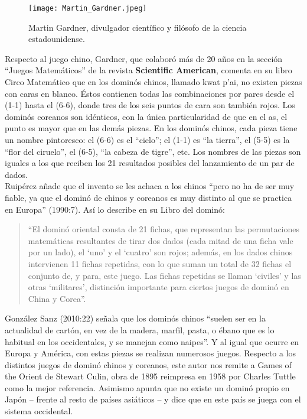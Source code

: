 \begin{figure}[h]
  \label{Martin_Gardner}
  \begin{center}
    \texttt{[image: Martin\_Gardner.jpeg]}
  \end{center}
  \caption{Martin Gardner, divulgador científico y filósofo de la ciencia estadounidense.}
\end{figure}


Respecto al juego chino, Gardner, que colaboró más de 20 años en la sección “Juegos Matemáticos” de
la revista \textbf{Scientific American}, comenta en su libro Circo Matemático que en los dominós chinos,
llamado kwat p’ai, no existen piezas con caras en blanco. Éstos contienen todas las combinaciones
por pares desde el (1-1)  hasta el (6-6), donde tres de los seis puntos de cara son también rojos.
Los dominós coreanos son idénticos, con la única particularidad de que en el as, el punto es mayor
que en las demás piezas. En los dominós chinos, cada pieza tiene un nombre pintoresco: el (6-6)
es el “cielo”; el (1-1) es “la tierra”, el (5-5) es la “flor del ciruelo”, el (6-5), “la cabeza de
tigre”, etc. Los nombres de las piezas son iguales a los que reciben los 21 resultados posibles del
lanzamiento de un par de dados. \\

Ruipérez añade que el invento se les achaca a los chinos “pero no ha de ser muy fiable, ya que el
dominó de chinos y coreanos es muy distinto al que se practica en Europa” (1990:7). Así lo describe
en su Libro del dominó:

\begin{quote}
“El dominó oriental consta de 21 fichas, que representan las permutaciones matemáticas resultantes
de tirar dos dados (cada mitad de una ficha vale por un lado), el ‘uno’ y el ‘cuatro’ son rojos;
además, en los dados chinos intervienen 11 fichas repetidas, con lo que suman un total de 32 fichas
el conjunto de, y para, este juego. Las fichas repetidas se llaman ‘civiles’ y las otras ‘militares’,
distinción importante para ciertos juegos de dominó en China y Corea”.
\end{quote}

González Sanz (2010:22) señala que los dominós chinos “suelen ser en la actualidad de cartón, en vez
de la madera, marfil, pasta, o ébano que es lo habitual en los occidentales, y se manejan como naipes”.
Y al igual que ocurre en Europa y América, con estas piezas se realizan numerosos juegos. Respecto a
los distintos juegos de dominó chinos y coreanos, este autor nos remite a Games of the Orient de Stewart
Culin, obra de 1895 reimpresa en 1958 por Charles Tuttle como la mejor referencia. Asimismo apunta que
no existe un dominó propio en Japón – frente al resto de países asiáticos – y dice que en este país se
juega con el sistema occidental. \\

